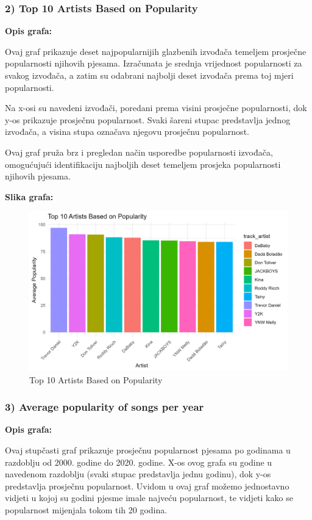 	\subsubsection{2) Top 10 Artists Based on Popularity}
	
	\textbf{Opis grafa:}
	
	Ovaj graf prikazuje deset najpopularnijih glazbenih izvođača temeljem prosječne popularnosti njihovih pjesama. Izračunata je srednja vrijednost popularnosti za svakog izvođača, a zatim su odabrani najbolji deset izvođača prema toj mjeri popularnosti.
	
	Na x-osi su navedeni izvođači, poredani prema visini prosječne popularnosti, dok y-os prikazuje prosječnu popularnost. Svaki šareni stupac predstavlja jednog izvođača, a visina stupa označava njegovu prosječnu popularnost.
	
	Ovaj graf pruža brz i pregledan način usporedbe popularnosti izvođača, omogućujući identifikaciju najboljih deset temeljem prosjeka popularnosti njihovih pjesama.
	
	\textbf{Slika grafa:}
	\begin{figure}[H]
		\includegraphics[scale=0.9]{slike/Top 10 popularity}
		\centering
		\caption{Top 10 Artists Based on Popularity}
		
	\end{figure}


	\subsubsection{3) Average popularity of songs per year}
	
	\textbf{Opis grafa:}
	
	Ovaj stupčasti graf prikazuje prosječnu popularnost pjesama po godinama u razdoblju od 2000. godine do 2020. godine. X-os ovog grafa su godine u navedenom razdoblju (svaki stupac predstavlja jednu godinu), dok y-os predstavlja prosječnu popularnost. 
	Uvidom u ovaj graf možemo jednostavno vidjeti u kojoj su godini pjesme imale najveću popularnost, te vidjeti kako se popularnost mijenjala tokom tih 20 godina.

